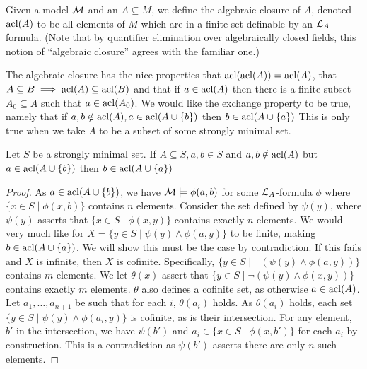 \begin{definition}\label{definition_algebraic_closure}
Given a model \(\mathcal{M}\) and an \(A \subseteq M\), we define the algebraic closure of \(A\), denoted \(\text{acl}(A)\) to be all elements of \(M\) which are in a finite set definable by an \(\mathcal{L}_A\)-formula. 
(Note that by quantifier elimination over algebraically closed fields, this notion of ``algebraic closure'' agrees with the familiar one.)
\end{definition}

The algebraic closure has the nice properties that \(\text{acl}(\text{acl}(A)) = \text{acl}(A)\), that \(A \subseteq B \implies \text{acl}(A) \subseteq \text{acl}(B)\) and that if \(a \in \text{acl}(A)\) then there is a finite subset \(A_0 \subseteq A\) such that \(a \in \text{acl}(A_0)\).
We would like the exchange property to be true, namely that if \(a, b \notin \text{acl}(A), a \in \text{acl}(A \cup \{b\})\) then \(b \in \text{acl}(A \cup \{a\})\) 
This is only true when we take \(A\) to be a subset of some strongly minimal set.

\begin{theorem}\label{theorem_exchange}
Let \(S\) be a strongly minimal set. If \(A \subseteq S, a, b \in S\) and \(a, b \notin \text{acl}(A)\) but \(a \in \text{acl}(A \cup \{b\})\) then \(b \in \text{acl}(A \cup \{a\})\) 
\end{theorem}


\begin{proof}
As \(a \in \text{acl}(A \cup \{b\})\), we have \(\mathcal{M} \models \phi(a, b)\) for some \(\mathcal{L}_A\)-formula 
\(\phi\) where \(\{x \in S \mid \phi(x, b)\}\) contains \(n\) elements. 
Consider the set defined by \(\psi(y)\), where \(\psi(y)\) asserts that \(\{x \in S \mid \phi(x, y)\}\) contains exactly \(n\) elements. %
We would very much like for \(X = \{y \in S \mid \psi(y) \land \phi(a, y)\}\) to be finite, making \(b \in \text{acl}(A \cup \{a\})\). 
We will show this must be the case by contradiction.
If this fails and \(X\) is infinite, then \(X\) is cofinite. 
Specifically, \(\{y \in S \mid \neg(\psi(y) \land \phi(a, y))\}\) contains \(m\) elements.  
We let \(\theta(x)\) assert that \(\{y \in S \mid \neg(\psi(y) \land \phi(x, y))\}\) contains exactly \(m\) elements.
\(\theta\) also defines a cofinite set, as otherwise \(a \in \text{acl}(A)\).   
Let \(a_1, \ldots, a_{n+1}\) be such that for each \(i\), \(\theta(a_i)\) holds.
As \(\theta(a_i)\) holds, each set \(\{y \in S \mid \psi(y) \land \phi(a_i, y)\}\) is cofinite, as is their intersection. 
For any element, \(b'\) in the intersection, we have \(\psi(b')\) and \(a_i \in \{x \in S \mid \phi(x, b')\}\) for each \(a_i\) by construction.
This is a contradiction as \(\psi(b')\) asserts there are only \(n\) such elements.  
\end{proof}

